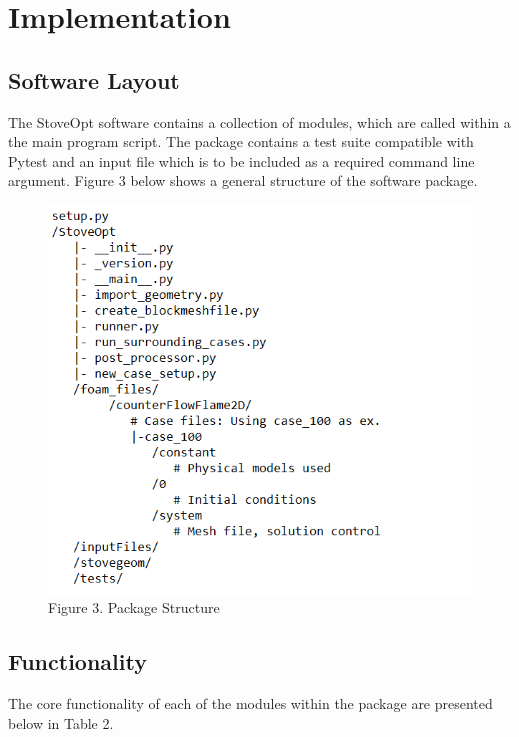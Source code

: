 \documentclass[3p,times,twocolumn]{elsarticle}
\begin{document}
\section{Implementation}

\subsection{Software Layout}
The StoveOpt software contains a collection of modules, which are called within a the main program script. The package contains a test suite compatible with Pytest and an input file which is to be included as a required command line argument. Figure 3 below shows a general structure of the software package.

\begin{figure}{\linewidth}
	\includegraphics[width=\linewidth]{skeleton.PNG}
	\caption{Figure 3. Package Structure}
\end{figure}

\subsection{Functionality}
The core functionality of each of the modules within the package are presented below in Table 2. 
\end{document}
